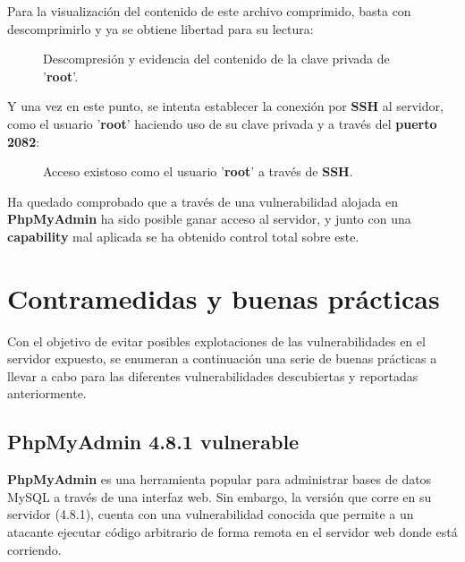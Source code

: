 \documentclass[a4paper]{article} %
\begin{document}
    Para la visualización del contenido de este archivo comprimido, basta con descomprimirlo y ya se obtiene libertad para su lectura:

   \begin{figure}[h]
      \centering
      \setlength{\fboxrule}{0.8pt}
      \caption{Descompresión y evidencia del contenido de la clave privada de '\textbf{root}'.}
   \end{figure}

  Y una vez en este punto, se intenta establecer la conexión por \textbf{SSH} al servidor, como el usuario '\textbf{root}' haciendo uso de su clave privada y a través del \textbf{puerto 2082}:

  \begin{figure}[h]
      \centering
      \setlength{\fboxrule}{0.8pt}
      \caption{Acceso existoso como el usuario '\textbf{root}' a través de \textbf{SSH}.}
 \end{figure}

  Ha quedado comprobado que a través de una vulnerabilidad alojada en \textbf{PhpMyAdmin} ha sido posible ganar acceso al servidor, y junto con una \textbf{capability} mal aplicada se ha obtenido control total sobre este.

  \clearpage

  \section{Contramedidas y buenas prácticas}\label{sec:contramedidas}
    Con el objetivo de evitar posibles explotaciones de las vulnerabilidades en el servidor expuesto, se enumeran a continuación una serie de buenas prácticas a llevar a cabo para las diferentes vulnerabilidades descubiertas y reportadas anteriormente.

    \subsection{PhpMyAdmin 4.8.1 vulnerable}
    
  \textbf{PhpMyAdmin} es una herramienta popular para administrar bases de datos MySQL a través de una interfaz web. Sin embargo, la versión que corre en su servidor (4.8.1), cuenta con una vulnerabilidad conocida que permite a un atacante ejecutar código arbitrario de forma remota en el servidor web donde está corriendo.
\end{document}
